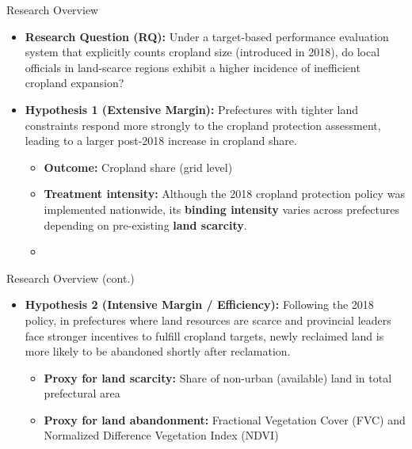 \documentclass[10pt, xcolor=x11names,compress, aspectratio=169]{beamer}
\begin{document}
\begin{frame}{Research Overview}
\hypertarget{overview}{}
\begin{itemize}
    \item \textbf{Research Question (RQ):} Under a target-based performance evaluation system that explicitly counts cropland size (introduced in 2018), do local officials in land-scarce regions exhibit a higher incidence of inefficient cropland expansion?
    \vspace{0.5em}
    \item \textbf{Hypothesis 1 (Extensive Margin):} 
    Prefectures with tighter land constraints respond more strongly to the cropland protection assessment, leading to a larger post-2018 increase in cropland share.
    \begin{itemize}
        \item \textbf{Outcome:} Cropland share (grid level)
        \item \textbf{Treatment intensity:} Although the 2018 cropland protection policy was implemented nationwide, its \textbf{binding intensity} varies across prefectures depending on pre-existing \textbf{land scarcity}.
        \item \hyperlink{balancepolicy}{} \quad \hyperlink{preliminaryresult}{}
    \end{itemize}
\end{itemize}
\end{frame}

\begin{frame}{Research Overview (cont.)}
\begin{itemize}
    \item \textbf{Hypothesis 2 (Intensive Margin / Efficiency):}
    Following the 2018 policy, in prefectures where land resources are scarce and provincial leaders face stronger incentives to fulfill cropland targets, newly reclaimed land is more likely to be abandoned shortly after reclamation.
    \vspace{0.5em}
    \begin{itemize}
        \item \textbf{Proxy for land scarcity:} Share of non-urban (available) land in total prefectural area
        \item \textbf{Proxy for land abandonment:} Fractional Vegetation Cover (FVC) and Normalized Difference Vegetation Index (NDVI)
    \end{itemize}
\end{itemize}
\end{frame}
\end{document}

